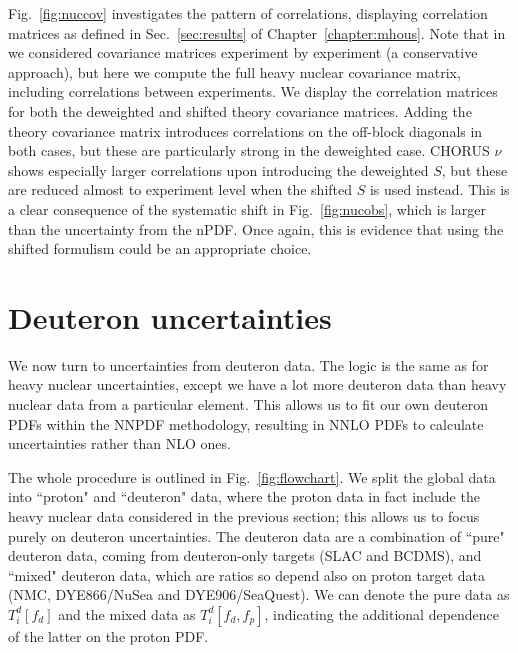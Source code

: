 Fig.~\ref{fig:nuccov} investigates the pattern of correlations, displaying correlation matrices as defined in Sec.~\ref{sec:results} of Chapter~\ref{chapter:mhous}. Note that in \cite{Ball:2018twp} we considered covariance matrices experiment by experiment (a conservative approach), but here we compute the full heavy nuclear covariance matrix, including correlations between experiments. We display the correlation matrices for both the deweighted and shifted theory covariance matrices. Adding the theory covariance matrix introduces correlations on the off-block diagonals in both cases, but these are particularly strong in the deweighted case. CHORUS $\nu$ shows especially larger correlations upon introducing the deweighted $S$, but these are reduced almost to experiment level when the shifted $S$ is used instead. This is a clear consequence of the systematic shift in Fig.~\ref{fig:nucobs}, which is larger than the uncertainty from the nPDF. Once again, this is evidence that using the shifted formulism could be an appropriate choice.

\section{Deuteron uncertainties}
\label{sec:deutunc}
We now turn to uncertainties from deuteron data. The logic is the same as for heavy nuclear uncertainties, except we have a lot more deuteron data than heavy nuclear data from a particular element. This allows us to fit our own deuteron PDFs within the NNPDF methodology, resulting in NNLO PDFs to calculate uncertainties rather than NLO ones. 

The whole procedure is outlined in Fig.~\ref{fig:flowchart}. We split the global data into ``proton" and ``deuteron" data, where the proton data in fact include the heavy nuclear data considered in the previous section; this allows us to focus purely on deuteron uncertainties. The deuteron data are a combination of ``pure" deuteron data, coming from deuteron-only targets (SLAC and BCDMS), and ``mixed" deuteron data, which are ratios so depend also on proton target data (NMC, DYE866/NuSea and DYE906/SeaQuest). We can denote the pure data as $T_i^d[f_d]$ and the mixed data as $T_i^d[f_d, f_p]$, indicating the additional dependence of the latter on the proton PDF.

